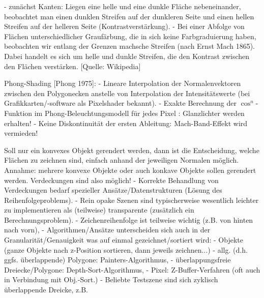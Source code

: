 \documentclass[10pt,landscape]{article}
\makeatletter
\renewcommand{\subsection}{\@startsection{subsection}{2}{0mm}%
                                {-1explus -.5ex minus -.2ex}%
                                {0.5ex plus .2ex}%
                                {\normalfont\normalsize\bfseries}}
\makeatother
\begin{document}
\begin{multicols}{3}
  - zunächst Kanten: Liegen eine helle und eine dunkle Fläche nebeneinander, beobachtet man einen dunklen Streifen auf der dunkleren Seite und einen hellen Streifen auf der helleren Seite (Kontrastverstärkung).
  - Bei einer Abfolge von Flächen unterschiedlicher Graufärbung, die in sich keine Farbgraduierung haben, beobachten wir entlang der Grenzen machsche Streifen (nach Ernst Mach 1865). Dabei handelt es sich um helle und dunkle Streifen, die den Kontrast zwischen den Flächen verstärken. [Quelle: Wikipedia]
  
  Phong-Shading [Phong 1975]:
  - Lineare Interpolation der Normalenvektoren zwischen den Polygonecken anstelle von Interpolation der Intensitätswerte (bei Grafikkarten/-software als Pixelshader bekannt).
  - Exakte Berechnung der $\cos^n$-Funktion im Phong-Beleuchtungsmodell für jedes Pixel : Glanzlichter werden erhalten!
  - Keine Diskontinuität der ersten Ableitung: Mach-Band-Effekt wird vermieden!
  
  
  Soll nur ein konvexes Objekt gerendert werden, dann ist die Entscheidung, welche Flächen zu zeichnen sind, einfach anhand der jeweiligen Normalen möglich.\\
  Annahme: mehrere konvexe Objekte oder auch konkave Objekte sollen gerendert werden. Verdeckungen sind also möglich!
  - Korrekte Behandlung von Verdeckungen bedarf spezieller Ansätze/Datenstrukturen (Lösung des Reihenfolgeproblems).
  - Rein opake Szenen sind typischerweise wesentlich leichter zu implementieren als (teilweise) transparente (zusätzlich ein Berechnungsproblem).
  - Zeichenreihenfolge ist teilweise wichtig (z.B. von hinten nach vorn), 
  - Algorithmen/Ansätze unterscheiden sich auch in der Granularität/Genauigkeit was auf einmal gezeichnet/sortiert wird:
  - Objekte (ganze Objekte nach z-Position sortieren, dann jeweils zeichnen...)
  - allg. (d.h. ggfs. überlappende) Polygone: Painters-Algorithmus,
  - überlappungsfreie Dreiecke/Polygone: Depth-Sort-Algorithmus,
  - Pixel: Z-Buffer-Verfahren (oft auch in Verbindung mit Obj.-Sort.)
  - Beliebte Testszene sind sich zyklisch überlappende Dreicke, z.B.
  

\end{multicols}
\end{document}
